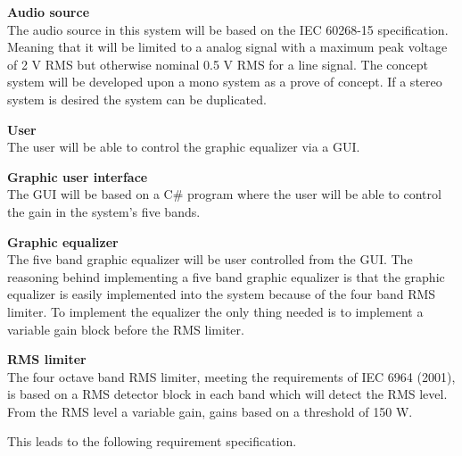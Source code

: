 \textbf{Audio source} \\
The audio source in this system will be based on the IEC 60268-15 specification. Meaning that it will be limited to a analog signal with a maximum peak voltage of 2 V RMS but otherwise nominal 0.5 V RMS for a line signal. The concept system will be developed upon a mono system as a prove of concept. If a stereo system is desired the system can be duplicated. %

\textbf{User} \\
The user will be able to control the graphic equalizer via a GUI. 

\textbf{Graphic user interface}\\
The GUI will be based on a C\# program where the user will be able to control the gain in the system's five bands.

\textbf{Graphic equalizer}\\
The five band graphic equalizer will be user controlled from the GUI. The reasoning behind implementing a five band graphic equalizer is that the graphic equalizer is easily implemented into the system because of the four band RMS limiter. To implement the equalizer the only thing needed is to implement a variable gain block before the RMS limiter.

\textbf{RMS limiter}\\
The four octave band RMS limiter, meeting the requirements of IEC 6964 (2001), is based on a RMS detector block in each band which will detect the RMS level. From the RMS level a variable gain, gains based on a threshold of 150 W. 

This leads to the following requirement specification. 














